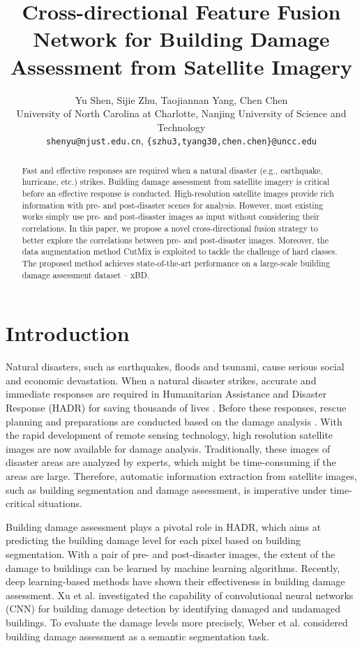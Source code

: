 \documentclass{article}
\title{Cross-directional Feature Fusion Network for Building Damage Assessment from Satellite Imagery}
\author{Yu Shen,
Sijie Zhu, Taojiannan Yang, Chen Chen \\
 University of North Carolina at Charlotte, Nanjing University of Science and Technology\\
  \texttt{shenyu@njust.edu.cn}, \texttt{\{szhu3,tyang30,chen.chen\}@uncc.edu} \\
}
\begin{document}
\maketitle

\begin{abstract}
Fast and effective responses are required when a natural disaster (e.g., earthquake, hurricane, etc.) strikes. Building damage assessment from satellite imagery is critical before an effective response is conducted. High-resolution satellite images provide rich information with pre- and post-disaster scenes for analysis. However, most existing works simply use pre- and post-disaster images as input without considering their correlations. In this paper, we propose a novel cross-directional fusion strategy to better explore the correlations between pre- and post-disaster images. Moreover, the data augmentation method CutMix is exploited to tackle the challenge of hard classes. The proposed method achieves state-of-the-art performance on a large-scale building damage assessment dataset -- xBD.


\end{abstract}

\section{Introduction}
\label{secIntro}
Natural disasters, such as earthquakes, floods and tsunami, cause serious social and economic devastation. When a natural disaster strikes, accurate and immediate responses are required in Humanitarian Assistance and Disaster Response (HADR) for saving thousands of lives \cite{sidrane2019machine, doshi2019firenet}. Before these responses, rescue planning and preparations are conducted based on the damage analysis \cite{weber2020detecting}. With the rapid development of remote sensing technology, high resolution satellite images are now available for damage analysis. Traditionally, these images of disaster areas are analyzed by experts, which might be time-consuming if the areas are large. Therefore, automatic information extraction from satellite images, such as building segmentation and damage assessment, is imperative under time-critical situations. 

Building damage assessment plays a pivotal role in HADR, which aims at predicting the building damage level for each pixel based on building segmentation. With a pair of pre- and post-disaster images, the extent of the damage to buildings can be learned by machine learning algorithms. Recently, deep learning-based methods have shown their effectiveness in building damage assessment. Xu et al. \cite{xu2019building} investigated the capability of convolutional neural networks (CNN) for building damage detection by identifying damaged and undamaged buildings. To evaluate the damage levels more precisely, Weber et al. \cite{weber2020building} considered building damage assessment as a semantic segmentation task. 
\end{document}
